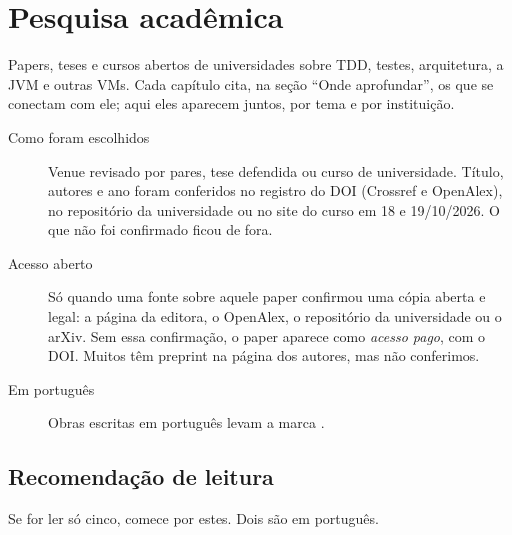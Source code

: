 \chapter{Pesquisa acadêmica}
\label{ap:pesquisa}

Papers, teses e cursos abertos de universidades sobre TDD, testes,
arquitetura, a JVM e outras VMs. Cada capítulo cita, na seção
\enquote{Onde aprofundar}, os que se conectam com ele; aqui eles aparecem
juntos, por tema e por instituição.

\begin{description}
\item[Como foram escolhidos] Venue revisado por pares, tese defendida ou
  curso de universidade. Título, autores e ano foram conferidos no registro
  do DOI (Crossref e OpenAlex), no repositório da universidade ou no site do
  curso em 18 e 19/10/2026. O que não foi confirmado ficou de fora.
\item[Acesso aberto] Só quando uma fonte sobre aquele paper confirmou uma
  cópia aberta e legal: a página da editora, o OpenAlex, o repositório da
  universidade ou o arXiv. Sem essa confirmação, o paper aparece como
  \emph{acesso pago}, com o DOI. Muitos têm preprint na página dos autores,
  mas não conferimos.
\item[Em português] Obras escritas em português levam a marca \pt.
\end{description}

\section{Recomendação de leitura}
Se for ler só cinco, comece por estes. Dois são em português.

